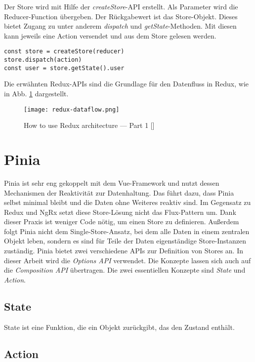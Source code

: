 Der Store wird mit Hilfe der \textit{createStore}-API erstellt. Als Parameter wird die Reducer-Function übergeben. Der Rückgabewert ist das Store-Objekt. Dieses bietet Zugang zu unter anderem \textit{dispatch} und \textit{getState}-Methoden. Mit diesen kann jeweils eine Action versendet und aus dem Store gelesen werden.

\begin{lstlisting}
const store = createStore(reducer)
store.dispatch(action)
const user = store.getState().user
\end{lstlisting}

Die erwähnten Redux-APIs sind die Grundlage für den Datenfluss in Redux, wie in Abb. \ref{fig:redux-dataflow} dargestellt.

\begin{figure}[H]
  \texttt{[image: redux-dataflow.png]}
  \caption{How to use Redux architecture — Part 1 [\citeyear{reduxDataFlow}]}
  \label{fig:redux-dataflow}
\end{figure}

\section{Pinia}

Pinia ist sehr eng gekoppelt mit dem Vue-Framework und nutzt dessen Mechanismen der Reaktivität zur Datenhaltung. Das führt dazu, dass Pinia selbst minimal bleibt und die Daten ohne Weiteres reaktiv sind. Im Gegensatz zu Redux und NgRx setzt diese Store-Lösung nicht das Flux-Pattern um. Dank dieser Praxis ist weniger Code nötig, um einen Store zu definieren. Außerdem folgt Pinia nicht dem Single-Store-Ansatz, bei dem alle Daten in einem zentralen Objekt leben, sondern es sind für Teile der Daten eigenständige Store-Instanzen zuständig. Pinia bietet zwei verschiedene APIs zur Definition von Stores an. In dieser Arbeit wird die \textit{Options API} verwendet. Die Konzepte lassen sich auch auf die \textit{Composition API} übertragen.\cite{piniaDefiningAStore} Die zwei essentiellen Konzepte sind \textit{State} und \textit{Action}.

\subsection{State}

State ist eine Funktion, die ein Objekt zurückgibt, das den Zustand enthält.

\subsection{Action}

